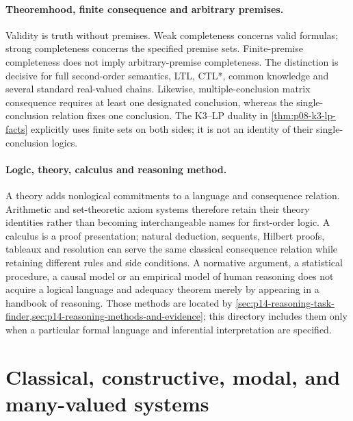 \paragraph{Theoremhood, finite consequence and arbitrary premises.}
Validity is truth without premises. Weak completeness concerns valid
formulas; strong completeness concerns the specified premise sets.
Finite-premise completeness does not imply arbitrary-premise completeness.
The distinction is decisive for full second-order semantics, LTL, CTL*,
common knowledge and several standard real-valued chains. Likewise,
multiple-conclusion matrix consequence requires at least one designated
conclusion, whereas the single-conclusion relation fixes one conclusion.
The K3--LP duality in \cref{thm:p08-k3-lp-facts} explicitly uses finite
sets on both sides; it is not an identity of their single-conclusion logics.

\paragraph{Logic, theory, calculus and reasoning method.}
A theory adds nonlogical commitments to a language and consequence relation.
Arithmetic and set-theoretic axiom systems therefore retain their theory
identities rather than becoming interchangeable names for first-order logic.
A calculus is a proof presentation; natural deduction, sequents, Hilbert
proofs, tableaux and resolution can serve the same classical consequence
relation while retaining different rules and side conditions. A normative
argument, a statistical procedure, a causal model or an empirical model of
human reasoning does not acquire a logical language and adequacy theorem
merely by appearing in a handbook of reasoning. Those methods are located
by \cref{sec:p14-reasoning-task-finder,sec:p14-reasoning-methods-and-evidence};
this directory includes them only when a particular formal language and
inferential interpretation are specified.

\section{Classical, constructive, modal, and many-valued systems}
\label{sec:p14-directory-classical-constructive}

